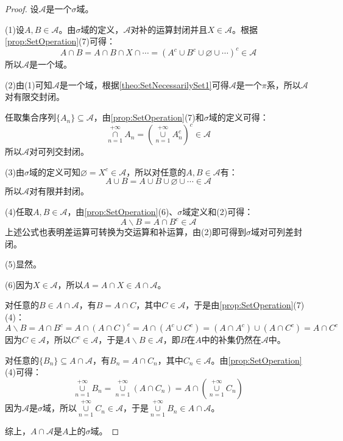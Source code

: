 \begin{proof}
	设$\mathscr{A}$是一个$\sigma$域。\par
	(1)设$A,B\in\mathscr{A}$。由$\sigma$域的定义，$\mathscr{A}$对补的运算封闭并且$X\in\mathscr{A}$。根据\cref{prop:SetOperation}(7)可得：
	\begin{equation*}
		A\cap B=A\cap B\cap X\cap\cdots=(A^c\cup B^c\cup\varnothing\cup\cdots)^c\in\mathscr{A}
	\end{equation*}
	所以$\mathscr{A}$是一个域。\par
	(2)由(1)可知$\mathscr{A}$是一个域，根据\cref{theo:SetNecessarilySet1}可得$\mathscr{A}$是一个$\pi$系，所以$\mathscr{A}$对有限交封闭。\par
	任取集合序列$\{A_n\}\subseteq\mathscr{A}$，由\cref{prop:SetOperation}(7)和$\sigma$域的定义可得：
	\begin{equation*}
		\underset{n=1}{\overset{+\infty}{\cap}}A_n=\left(\underset{n=1}{\overset{+\infty}{\cup}}A_n^c\right)^c\in\mathscr{A}
	\end{equation*}
	所以$\mathscr{A}$对可列交封闭。\par
	(3)由$\sigma$域的定义可知$\varnothing=X^c\in\mathscr{A}$，所以对任意的$A,B\in\mathscr{A}$有：
	\begin{equation*}
		A\cup B=A\cup B\cup\varnothing\cup\cdots\in\mathscr{A}
	\end{equation*}
	所以$\mathscr{A}$对有限并封闭。\par
	(4)任取$A,B\in\mathscr{A}$，由\cref{prop:SetOperation}(6)、$\sigma$域定义和(2)可得：
	\begin{equation*}
		A\backslash B=A\cap B^c\in\mathscr{A}
	\end{equation*}
	上述公式也表明差运算可转换为交运算和补运算，由(2)即可得到$\sigma$域对可列差封闭。\par
	(5)显然。\par
	(6)因为$X\in\mathscr{A}$，所以$A=A\cap X\in A\cap\mathscr{A}$。\par
	对任意的$B\in A\cap\mathscr{A}$，有$B=A\cap C$，其中$C\in\mathscr{A}$，于是由\cref{prop:SetOperation}(7)(4)：
	\begin{equation*}
		A\backslash B=A\cap B^c=A\cap(A\cap C)^c=A\cap(A^c\cup C^c)=(A\cap A^c)\cup(A\cap C^c)=A\cap C^c
	\end{equation*}
	因为$C\in\mathscr{A}$，所以$C^c\in\mathscr{A}$，于是$A\backslash B\in\mathscr{A}$，即$B$在$A$中的补集仍然在$\mathscr{A}$中。\par
	对任意的$\{B_n\}\subseteq A\cap\mathscr{A}$，有$B_n=A\cap C_n$，其中$C_n\in\mathscr{A}$。由\cref{prop:SetOperation}(4)可得：
	\begin{equation*}
		\underset{n=1}{\overset{+\infty}{\cup}}B_n=\underset{n=1}{\overset{+\infty}{\cup}}(A\cap C_n)=A\cap\left(\underset{n=1}{\overset{+\infty}{\cup}}C_n\right)
	\end{equation*}
	因为$\mathscr{A}$是$\sigma$域，所以$\underset{n=1}{\overset{+\infty}{\cup}}C_n\in\mathscr{A}$，于是$\underset{n=1}{\overset{+\infty}{\cup}}B_n\in A\cap\mathscr{A}$。\par
	综上，$A\cap\mathscr{A}$是$A$上的$\sigma$域。
\end{proof}

